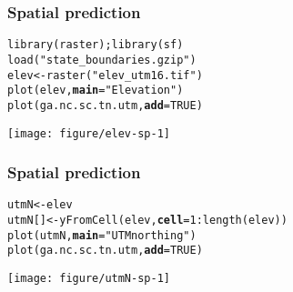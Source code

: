 \documentclass[color=usenames,dvipsnames]{beamer}\usepackage[]{graphicx}\usepackage[]{color}
\makeatletter
\newcommand{\hlnum}[1]{\textcolor[rgb]{0.69,0.494,0}{#1}}%
\newcommand{\hlstr}[1]{\textcolor[rgb]{0.749,0.012,0.012}{#1}}%
\newcommand{\hlopt}[1]{\textcolor[rgb]{0,0,0}{#1}}%
\newcommand{\hlstd}[1]{\textcolor[rgb]{0,0,0}{#1}}%
\newcommand{\hlkwb}[1]{\textcolor[rgb]{0,0.341,0.682}{#1}}%
\newcommand{\hlkwc}[1]{\textcolor[rgb]{0,0,0}{\textbf{#1}}}%
\newcommand{\hlkwd}[1]{\textcolor[rgb]{0.004,0.004,0.506}{#1}}%
\newenvironment{kframe}{%
 \def\at@end@of@kframe{}%
 \ifinner\ifhmode%
  \def\at@end@of@kframe{\end{minipage}}%
  \begin{minipage}{\columnwidth}%
 \fi\fi%
 \def\FrameCommand##1{\hskip\@totalleftmargin \hskip-\fboxsep
 \colorbox{shadecolor}{##1}\hskip-\fboxsep
     \hskip-\linewidth \hskip-\@totalleftmargin \hskip\columnwidth}%
 \MakeFramed {\advance\hsize-\width
   \@totalleftmargin\z@ \linewidth\hsize
   \@setminipage}}%
 {\par\unskip\endMakeFramed%
 \at@end@of@kframe}
\newenvironment{knitrout}{}{} %
\makeatother
\begin{document}
\begin{frame}[fragile]
  \frametitle{Spatial prediction}
\begin{knitrout}\scriptsize
{}\color{fgcolor}\begin{kframe}
\begin{alltt}
\hlkwd{library}\hlstd{(raster);} \hlkwd{library}\hlstd{(sf)}
\hlkwd{load}\hlstd{(}\hlstr{"state_boundaries.gzip"}\hlstd{)}
\hlstd{elev} \hlkwb{<-} \hlkwd{raster}\hlstd{(}\hlstr{"elev_utm16.tif"}\hlstd{)}
\hlkwd{plot}\hlstd{(elev,} \hlkwc{main}\hlstd{=}\hlstr{"Elevation"}\hlstd{)}
\hlkwd{plot}\hlstd{(ga.nc.sc.tn.utm,} \hlkwc{add}\hlstd{=}\hlnum{TRUE}\hlstd{)}
\end{alltt}
\end{kframe}

{\centering \texttt{[image: figure/elev-sp-1]} 

}



\end{knitrout}
\end{frame}




\begin{frame}[fragile]
  \frametitle{Spatial prediction}
\begin{knitrout}\scriptsize
{}\color{fgcolor}\begin{kframe}
\begin{alltt}
\hlstd{utmN} \hlkwb{<-} \hlstd{elev}
\hlstd{utmN[]} \hlkwb{<-} \hlkwd{yFromCell}\hlstd{(elev,} \hlkwc{cell}\hlstd{=}\hlnum{1}\hlopt{:}\hlkwd{length}\hlstd{(elev))}
\hlkwd{plot}\hlstd{(utmN,} \hlkwc{main}\hlstd{=}\hlstr{"UTM northing"}\hlstd{)}
\hlkwd{plot}\hlstd{(ga.nc.sc.tn.utm,} \hlkwc{add}\hlstd{=}\hlnum{TRUE}\hlstd{)}
\end{alltt}
\end{kframe}

{\centering \texttt{[image: figure/utmN-sp-1]} 

}



\end{knitrout}
\end{frame}
\end{document}
